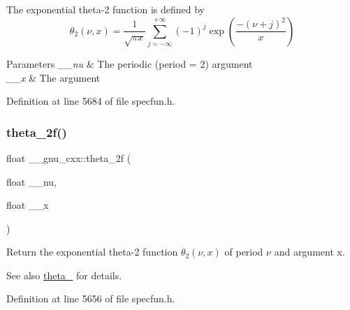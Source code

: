 The exponential theta-\/2 function is defined by \[ \theta_2(\nu,x) = \frac{1}{\sqrt{\pi x}} \sum_{j=-\infty}^{+\infty} (-1)^j \exp\left( \frac{-(\nu + j)^2}{x} \right) \]


\begin{DoxyParams}{Parameters}
{\em \+\_\+\+\_\+nu} & The periodic (period = 2) argument \\
\hline
{\em \+\_\+\+\_\+x} & The argument \\
\hline
\end{DoxyParams}


Definition at line 5684 of file specfun.\+h.

\mbox{\label{group__mathsf__gnu_ga78e832796aedf5159b142801e1184392}} 
\subsubsection{\texorpdfstring{theta\+\_\+2f()}{theta\_2f()}}
{\footnotesize\ttfamily float \+\_\+\+\_\+gnu\+\_\+cxx\+::theta\+\_\+2f (\begin{DoxyParamCaption}\item[{float}]{\+\_\+\+\_\+nu,  }\item[{float}]{\+\_\+\+\_\+x }\end{DoxyParamCaption})\hspace{0.3cm}{\ttfamily [inline]}}

Return the exponential theta-\/2 function $ \theta_2(\nu,x) $ of period $ \nu $ and argument {\ttfamily x}.

\begin{DoxySeeAlso}{See also}
\hyperlink{group__mathsf__gnu_ga16f278edeb2842d614bae1f1ae2d0256}{theta\+\_} for details. 
\end{DoxySeeAlso}


Definition at line 5656 of file specfun.\+h.

\mbox{\label{group__mathsf__gnu_gac5a30c772d4888442665945e7f3fa017}} 
